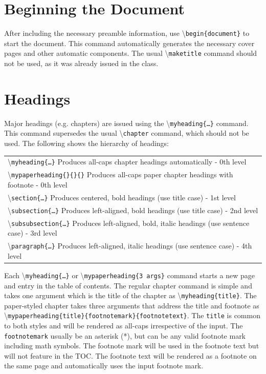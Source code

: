 \documentclass{article}
\newcommand\cmd[1]{\textbackslash\texttt{#1}}
\newcommand\ix[1]{#1\index{#1}} %
\newcommand\ixm[2]{#2\index{#1!#2}} %
\newcommand\ccmd[1]{ %
\begin{center}
\begin{tabular}{l}
#1
\end{tabular}
\end{center}
}
\begin{document}
\section{Beginning the Document}
After including the necessary preamble information, use \cmd{begin\{document\}} to start the \ix{document}. This command automatically generates the necessary cover pages and other automatic components. The usual \cmd{\ix{maketitle}} command should not be used, as it was already issued in the class.

\section{Headings}\label{heading}
Major headings (e.g. chapters) are issued using the \cmd{myheading\{\ldots\}} command. This command supersedes the usual \cmd{\ix{chapter}} command, which should not be used. The following shows the hierarchy of headings:
\ccmd{
\cmd{\ixm{heading}{myheading}\{\ldots\}} \hspace{0.6in} Produces all-caps chapter headings automatically - 0th level\\
\cmd{\ixm{heading}{mypaperheading}\{\}\{\}\{\}} \hspace{2.9ex} Produces all-caps paper chapter headings with footnote - 0th level\\
\cmd{\ixm{heading}{section}\{\ldots\}}  \hspace{0.74in} Produces centered, bold headings (use title case) - 1st level\\
\cmd{\ixm{heading}{subsection}\{\ldots\}} \hspace{0.52in} Produces left-aligned, bold headings (use title case) - 2nd level\\
\cmd{\ixm{heading}{subsubsection}\{\ldots\}}\hspace{0.35in}  Produces left-aligned, bold, italic headings (use sentence case) - 3rd level\\
\cmd{\ixm{heading}{paragraph}\{\ldots\}}\hspace{0.64in}  Produces left-aligned, italic headings (use sentence case) - 4th level
}

Each \cmd{myheading\{\ldots\}} or \cmd{mypaperheading\{3 args\}} command starts a new page and entry in the table of contents.  The regular chapter command is simple and takes one argument which is the title of the chapter as \cmd{myheading\{title\}}. The paper-styled chapter takes three arguments that address the title and footnote as
 \cmd{mypaperheading\{title\}\{footnotemark\}\{footnotetext\}}.  The \texttt{title} is common to both styles and will be rendered as all-caps irrespective of the input.  The \texttt{footnotemark} usually be an asterisk (*),  but can be any valid footnote mark including math symbols.  The footnote mark will be used in the footnote text but will not feature in the TOC.  The footnote text will be rendered as a footnote on the same page and automatically uses the input footnote mark.  
\end{document}

